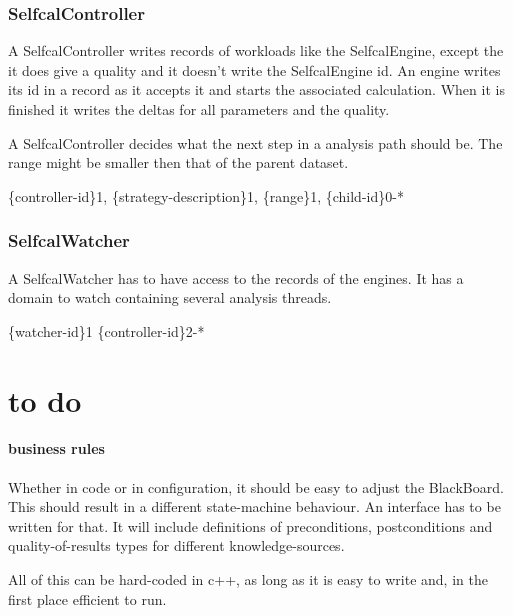 \documentclass[]{lofar}
\begin{document}
      \subsubsection{SelfcalController}
      \label{subsubsec:SelfcalController}\hypertarget{subsubsec:SelfcalController}{}

        A SelfcalController writes records of workloads like the
        SelfcalEngine, except the it does give a quality and it
        doesn't write the SelfcalEngine id. An engine writes its id in
        a record as it accepts it and starts the associated
        calculation. When it is finished it writes the deltas for all
        parameters and the quality.

        A SelfcalController decides what the next step in a analysis
        path should be. The range might be smaller then that of the
        parent dataset.

        \{controller-id\}1, \{strategy-description\}1, \{range\}1, \{child-id\}0-*

      \subsubsection{SelfcalWatcher}
      \label{subsubsec:SelfcalWatcher}\hypertarget{subsubsec:SelfcalWatcher}{}

        A SelfcalWatcher has to have access to the records of the
        engines. It has a domain to watch containing several analysis
        threads.

        \{watcher-id\}1 \{controller-id\}2-*

  \section{to do}
  \label{sec:todo}\hypertarget{sec:todo}{}

    \paragraph{business rules}
      Whether in code or in configuration, it should be easy to adjust
      the BlackBoard. This should result in a different state-machine
      behaviour. An interface has to be written for that. It will
      include definitions of preconditions, postconditions and
      quality-of-results types for different knowledge-sources.

      All of this can be hard-coded in c++, as long as it is easy to
      write and, in the first place efficient to run.
\end{document}
